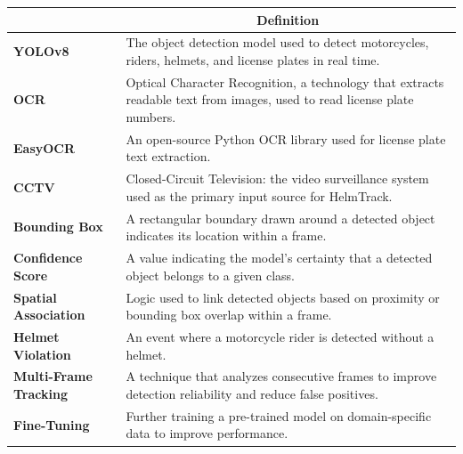 \begin{table}[h]
\centering
\begin{tabularx}{\textwidth}{|>{\bfseries}p{}|X|}
\hline
\multicolumn{1}{|c|}{\textbf{Term}} & \multicolumn{1}{c|}{\textbf{Definition}} \\
\hline
YOLOv8 & The object detection model used to detect motorcycles, riders, helmets, and license plates in real time. \\
\hline
OCR & Optical Character Recognition, a technology that extracts readable text from images, used to read license plate numbers. \\
\hline
EasyOCR & An open-source Python OCR library used for license plate text extraction. \\
\hline
CCTV & Closed-Circuit Television: the video surveillance system used as the primary input source for HelmTrack. \\
\hline
Bounding Box & A rectangular boundary drawn around a detected object indicates its location within a frame. \\
\hline
Confidence Score & A value indicating the model's certainty that a detected object belongs to a given class. \\
\hline
Spatial Association & Logic used to link detected objects based on proximity or bounding box overlap within a frame. \\
\hline
Helmet Violation & An event where a motorcycle rider is detected without a helmet. \\
\hline
Multi-Frame Tracking & A technique that analyzes consecutive frames to improve detection reliability and reduce false positives. \\
\hline
Fine-Tuning & Further training a pre-trained model on domain-specific data to improve performance. \\
\hline
\end{tabularx}
\end{table}
